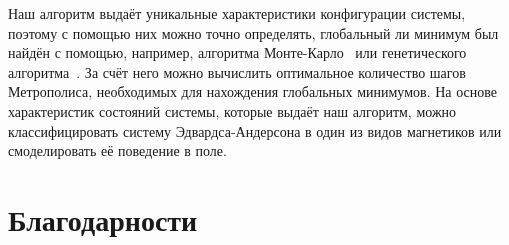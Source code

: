 \documentclass[utf8, babel, sor, jor, amsmath, amssymb, reprint]{elsarticle} %
\begin{document}
	Наш алгоритм выдаёт уникальные характеристики конфигурации системы, поэтому с помощью них можно точно определять, глобальный ли минимум был найдён с помощью, например, алгоритма Монте-Карло~\cite{janke2008monte} или генетического алгоритма~\cite{Panchenko2007}. За счёт него можно вычислить оптимальное количество шагов Метрополиса, необходимых для нахождения глобальных минимумов. На основе характеристик состояний системы, которые выдаёт наш алгоритм, можно классифицировать систему Эдвардса-Андерсона в один из видов магнетиков или смоделировать её поведение в поле.

	
	\section*{Благодарности}
	
	
	
	
	
	
\end{document}

